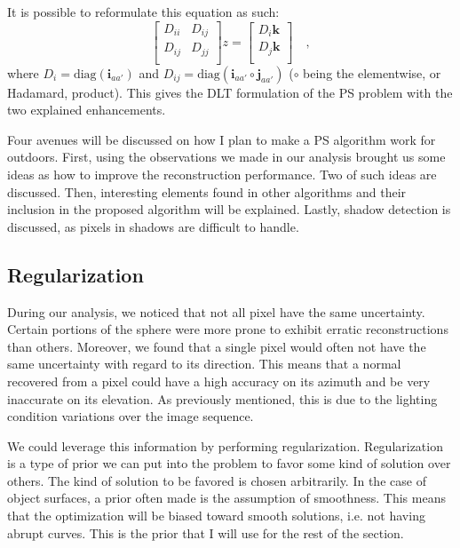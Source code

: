 \documentclass{report}
\begin{document}
It is possible to reformulate this equation as such:
\begin{equation}
\begin{bmatrix}
D_{ii} & D_{ij} \\
D_{ij} & D_{jj} \\
\end{bmatrix}
z =
\begin{bmatrix}
D_i \mathbf{k} \\
D_j \mathbf{k} \\
\end{bmatrix} \quad,
\end{equation}
where $D_i = \mathrm{diag}(\mathbf{i}_{aa'})$ and $ D_{ij} = \mathrm{diag}\left(\mathbf{i}_{aa'} \circ \mathbf{j}_{aa'}\right)$ ($\circ$ being the elementwise, or Hadamard, product). This gives the DLT formulation of the PS problem with the two explained enhancements.


Four avenues will be discussed on how I plan to make a PS algorithm work for outdoors. First, using the observations we made in our analysis brought us some ideas as how to improve the reconstruction performance. Two of such ideas are discussed. Then, interesting elements found in other algorithms and their inclusion in the proposed algorithm will be explained. Lastly, shadow detection is discussed, as pixels in shadows are difficult to handle.

\subsection{Regularization}

During our analysis, we noticed that not all pixel have the same uncertainty. Certain portions of the sphere were more prone to exhibit erratic reconstructions than others. Moreover, we found that a single pixel would often not have the same uncertainty with regard to its direction. This means that a normal recovered from a pixel could have a high accuracy on its azimuth and be very inaccurate on its elevation. As previously mentioned, this is due to the lighting condition variations over the image sequence.

We could leverage this information by performing regularization. Regularization is a type of prior we can put into the problem to favor some kind of solution over others. The kind of solution to be favored is chosen arbitrarily. In the case of object surfaces, a prior often made is the assumption of smoothness. This means that the optimization will be biased toward smooth solutions, i.e. not having abrupt curves. This is the prior that I will use for the rest of the section.
\end{document}
